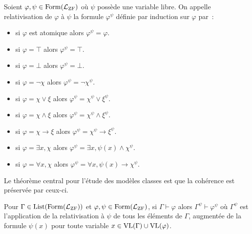 \begin{definition}
  Soient $\varphi,\psi\in\operatorname{Form}(\mathcal L_{\operatorname{ZF}})$ où $\psi$ possède une
  variable libre. On appelle relativisation de $\varphi$ à $\psi$ la formule
  $\varphi^\psi$ définie par induction sur $\varphi$ par~:
  \begin{itemize}
  \item si $\varphi$ est atomique alors $\varphi^\psi = \varphi$.
  \item si $\varphi = \top$ alors $\varphi^\psi = \top$.
  \item si $\varphi = \bot$ alors $\varphi^\psi = \bot$.
  \item si $\varphi = \lnot \chi$ alors $\varphi^\psi = \lnot \chi^\psi$.
  \item si $\varphi = \chi \lor \xi$ alors
    $\varphi^\psi = \chi^\psi \lor \xi^\psi$.
  \item si $\varphi = \chi \land \xi$ alors
    $\varphi^\psi = \chi^\psi \land \xi^\psi$.
  \item si $\varphi = \chi \to \xi$ alors
    $\varphi^\psi = \chi^\psi \to \xi^\psi$.
  \item si $\varphi = \exists x, \chi$ alors
    $\varphi^\psi = \exists x, \psi(x) \land \chi^\psi$.
  \item si $\varphi = \forall x, \chi$ alors
    $\varphi^\psi = \forall x, \psi(x) \to \chi^\psi$.
  \end{itemize}
\end{definition}

Le théorème central pour l'étude des modèles classes est que la cohérence est
préservée par ceux-ci.

\begin{lemma}\label{lem.relat.deduc}
  Pour $\Gamma\in\operatorname{List}(\operatorname{Form}(\mathcal L_{\operatorname{ZF}}))$ et
  $\varphi,\psi\in\operatorname{Form}(\mathcal L_{\operatorname{ZF}})$, si $\Gamma\vdash \varphi$ alors
  $\Gamma^\psi \vdash \varphi^\psi$ où $\Gamma^\psi$ est l'application de la
  relativisation à $\psi$ de tous les éléments de $\Gamma$, augmentée de la
  formule $\psi(x)$ pour toute variable $x\in \operatorname{VL}(\Gamma)\cup \operatorname{VL}(\varphi)$.
\end{lemma}

